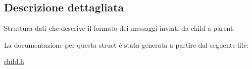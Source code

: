 \subsection{Descrizione dettagliata}
Struttura dati che descrive il formato dei messaggi inviati da child a parent. 

La documentazione per questa struct è stata generata a partire dal seguente file\+:\begin{DoxyCompactItemize}
\item 
\hyperlink{child_8h}{child.\+h}\end{DoxyCompactItemize}
